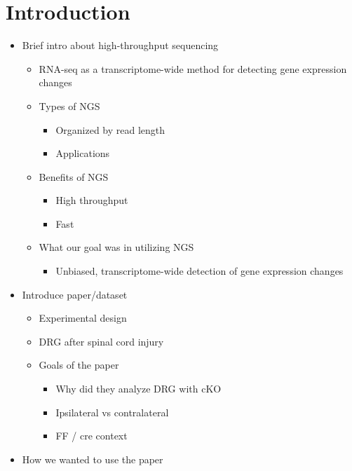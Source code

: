\documentclass[12pt]{article}
\begin{document}
\section*{\textcolor{nikhicolor}{Introduction}}
\begin{itemize}
\item \textcolor{nikhicolor}{Brief intro about high-throughput sequencing}
\begin{itemize}
\item \textcolor{pitercolor}{RNA-seq as a transcriptome-wide method for detecting gene expression changes}
\item \textcolor{nikhicolor}{Types of NGS}
\begin{itemize}
\item \textcolor{nikhicolor}{Organized by read length}
\item \textcolor{nikhicolor}{Applications}
\end{itemize}
\item \textcolor{nikhicolor}{Benefits of NGS}
\begin{itemize}
\item \textcolor{nikhicolor}{High throughput}
\item \textcolor{nikhicolor}{Fast}
\end{itemize}
\item \textcolor{nikhicolor}{What our goal was in utilizing NGS}
\begin{itemize}
\item \textcolor{pitercolor}{Unbiased, transcriptome-wide detection of gene expression changes}
\end{itemize}
\end{itemize}
\item \textcolor{samcolor}{Introduce paper/dataset}
\begin{itemize}
\item \textcolor{samcolor}{Experimental design}
\item \textcolor{samcolor}{DRG after spinal cord injury}
\item \textcolor{samcolor}{Goals of the paper}
\begin{itemize}
\item \textcolor{samcolor}{Why did they analyze DRG with cKO}
\item \textcolor{samcolor}{Ipsilateral vs contralateral}
\item \textcolor{pitercolor}{FF / cre context}
\end{itemize}
\end{itemize}
\item \textcolor{samcolor}{How we wanted to use the paper}

\end{itemize}
\end{document}
